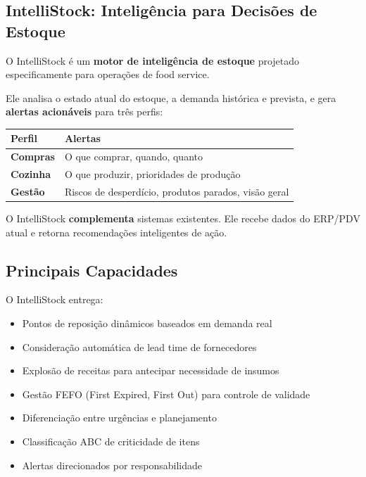 \subsection{IntelliStock: Inteligência para Decisões de Estoque}

O IntelliStock é um \textbf{motor de inteligência de estoque} projetado
especificamente para operações de food service.

Ele analisa o estado atual do estoque, a demanda histórica e prevista,
e gera \textbf{alertas acionáveis} para três perfis:

\begin{center}
\begin{tabular}{>{\bfseries}l p{8cm}}
\toprule
Perfil & Alertas \\
\midrule
Compras   & O que comprar, quando, quanto \\
Cozinha   & O que produzir, prioridades de produção \\
Gestão    & Riscos de desperdício, produtos parados, visão geral \\
\bottomrule
\end{tabular}
\end{center}

\begin{infobox}
O IntelliStock \textbf{complementa} sistemas existentes. Ele recebe dados do
ERP/PDV atual e retorna recomendações inteligentes de ação.
\end{infobox}

\subsection{Principais Capacidades}

O IntelliStock entrega:

\begin{itemize}[leftmargin=2em]
  \item Pontos de reposição dinâmicos baseados em demanda real
  \item Consideração automática de lead time de fornecedores
  \item Explosão de receitas para antecipar necessidade de insumos
  \item Gestão FEFO (First Expired, First Out) para controle de validade
  \item Diferenciação entre urgências e planejamento
  \item Classificação ABC de criticidade de itens
  \item Alertas direcionados por responsabilidade
\end{itemize}

